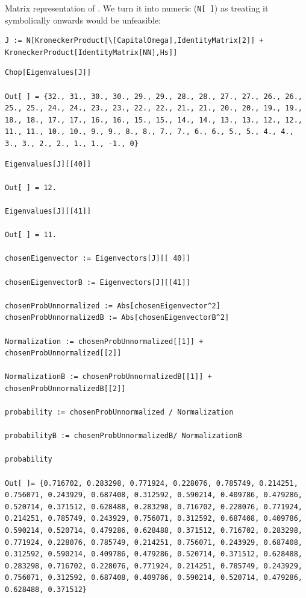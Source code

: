 Matrix representation of \cite[Eq. 1]{Lloyd:Time}.
We turn it into numeric (\verb!N[ ]!) as treating  it symbolically onwards would be unfeasible:
\begin{lstlisting}
J := N[KroneckerProduct[\[CapitalOmega],IdentityMatrix[2]] + KroneckerProduct[IdentityMatrix[NN],Hs]]
\end{lstlisting}
\begin{lstlisting}
Chop[Eigenvalues[J]]

Out[ ] = {32., 31., 30., 30., 29., 29., 28., 28., 27., 27., 26., 26., 25., 25., 24., 24., 23., 23., 22., 22., 21., 21., 20., 20., 19., 19., 18., 18., 17., 17., 16., 16., 15., 15., 14., 14., 13., 13., 12., 12., 11., 11., 10., 10., 9., 9., 8., 8., 7., 7., 6., 6., 5., 5., 4., 4., 3., 3., 2., 2., 1., 1., -1., 0}
\end{lstlisting}
\begin{lstlisting}
Eigenvalues[J][[40]]

Out[ ] = 12.

Eigenvalues[J][[41]]

Out[ ] = 11.

chosenEigenvector := Eigenvectors[J][[ 40]]

chosenEigenvectorB := Eigenvectors[J][[41]]

chosenProbUnnormalized := Abs[chosenEigenvector^2]
chosenProbUnnormalizedB := Abs[chosenEigenvectorB^2]

Normalization := chosenProbUnnormalized[[1]] + chosenProbUnnormalized[[2]]

NormalizationB := chosenProbUnnormalizedB[[1]] + chosenProbUnnormalizedB[[2]]

probability := chosenProbUnnormalized / Normalization

probabilityB := chosenProbUnnormalizedB/ NormalizationB

probability

Out[ ]= {0.716702, 0.283298, 0.771924, 0.228076, 0.785749, 0.214251, 0.756071, 0.243929, 0.687408, 0.312592, 0.590214, 0.409786, 0.479286, 0.520714, 0.371512, 0.628488, 0.283298, 0.716702, 0.228076, 0.771924, 0.214251, 0.785749, 0.243929, 0.756071, 0.312592, 0.687408, 0.409786, 0.590214, 0.520714, 0.479286, 0.628488, 0.371512, 0.716702, 0.283298, 0.771924, 0.228076, 0.785749, 0.214251, 0.756071, 0.243929, 0.687408, 0.312592, 0.590214, 0.409786, 0.479286, 0.520714, 0.371512, 0.628488, 0.283298, 0.716702, 0.228076, 0.771924, 0.214251, 0.785749, 0.243929, 0.756071, 0.312592, 0.687408, 0.409786, 0.590214, 0.520714, 0.479286, 0.628488, 0.371512}


\end{lstlisting}

